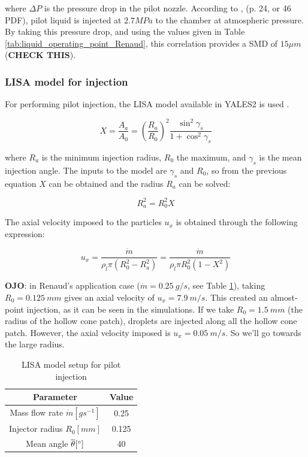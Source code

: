 where $\Delta P$ is the pressure drop in the pilot nozzle. According to , (p. 24, or 46 PDF), pilot liquid is injected at $2.7 MPa$ to the chamber at atmospheric pressure. By taking this pressure drop, and using the values given in Table \ref{tab:liquid_operating_point_Renaud}, this correlation provides a SMD of $15 \mu m$ (\textbf{CHECK THIS}).

\subsubsection*{LISA model for injection}

For performing pilot injection, the LISA model available in YALES2 is used . 

\begin{equation}
X = \frac{A_a}{A_0} = \left( \frac{R_a}{R_0} \right)^2 \frac{\sin^2 \gamma_s}{1 + \cos^2 \gamma_s}
\end{equation}

where $R_a$ is the minimum injection radius, $R_0$ the maximum, and $\gamma_s$ is the mean injection angle. The inputs to the model are $\gamma_s$ and $R_0$, so from the previous equation $X$ can be obtained and the radius $R_a$ can be solved:

\begin{equation}
R_a^2 = R_0^2 X
\end{equation}

The axial velocity imposed to the particles $u_x$ is obtained through the following expression:

\begin{equation}
u_x = \frac{\dot{m}}{\rho_l \pi \left( R_0^2 - R_a^2 \right)} = \frac{\dot{m}}{\rho_l \pi R_0^2 \left( 1 - X^2 \right)} 
\end{equation}

\textbf{OJO}: in Renaud's application case ($\dot{m} = 0.25 ~ g/s$, see Table \ref{tab:LISA_model_parameters}), taking $R_0 = 0.125 ~mm$ gives an axial velocity of $u_x = 7.9 ~ m/s$. This created an almost-point injection, as it can be seen in the simulations. If we take $R_0 = 1.5 ~mm$ (the radius of the hollow cone patch), droplets are injected along all the hollow cone patch. However, the axial velocity imposed is $u_x = 0.05 ~m/s$. So we'll go towards the large radius.

\begin{table}[!h]
\centering
\caption{LISA model setup for pilot injection}
\begin{tabular}{|c|c|}
\hline
\textbf{Parameter} & \textbf{Value} \\
\hline
Mass flow rate $\dot{m} [g s^{-1}]$ & 0.25 \\
\hline
Injector radius $R_0 [mm]$ & 0.125 \\
\hline
Mean angle $\overline{\theta} [\degree]$ & 40 \\
\hline
\end{tabular}
\label{tab:LISA_model_parameters}
\end{table}

